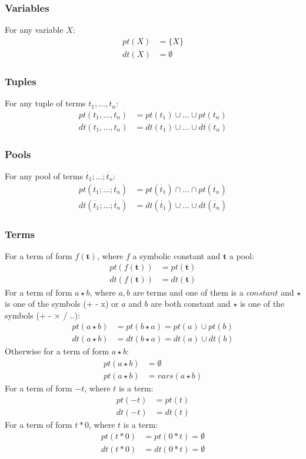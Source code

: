 \documentclass{article}
\newcommand{\pool}[1]{\boldsymbol{#1}}
\newcommand{\tuple}[1]{\dot{#1}}
\newcommand{\set}[1]{\{#1\}}
\begin{document}
	\subsubsection{Variables}
	For any variable $X$:
	\begin{align}
		pt(X) &= \set{X} \\
		dt(X) &= \emptyset
	\end{align}

	\subsubsection{Tuples}
	For any tuple of terms $t_1,...,t_n$:
	\begin{align}
		pt(t_1,...,t_n) &= pt(t_1) \cup \dots \cup pt(t_n) \\
		dt(t_1,...,t_n) &= dt(t_1) \cup \dots \cup dt(t_n)
	\end{align}

	\subsubsection{Pools}
	For any pool of terms $\tuple{t_1};...;\tuple{t_n}$:
	\begin{align}
		pt(\tuple{t_1};...;\tuple{t_n}) &= pt(\tuple{t_1}) \cap \dots \cap pt(\tuple{t_n}) \\
		dt(\tuple{t_1};...;\tuple{t_n}) &= dt(\tuple{t_1}) \cup \dots \cup dt(\tuple{t_n})
	\end{align}

	\subsubsection{Terms}
	For a term of form $f(\pool{t})$, where $f$ a symbolic constant and $\pool{t}$ a pool:
	\begin{align}
		pt(f(\pool{t})) &= pt(\pool{t}) \\
		dt(f(\pool{t})) &= dt(\pool{t})
	\end{align}
	For a term of form $a \star b$, where $a,b$ are terms and one of them is a $\mathit{constant}$ and $\star$ is one of the symbols (+ - x) or $a$ and $b$ are both constant and $\star$ is one of the symbols (+ - × / ..):
	\begin{align}
		pt(a \star b) &= pt(b \star a) = pt(a) \cup pt(b) \\
		dt(a \star b) &= dt(b \star a) = dt(a) \cup dt(b)
	\end{align}
	Otherwise for a term of form $a \star b$:
	\begin{align}
		pt(a \star b) &= \emptyset \\
		pt(a \star b) &= vars(a \star b)
	\end{align}
	For a term of form $-t$, where $t$ is a term:
	\begin{align}
		pt(-t) &= pt(t) \\
		dt(-t) &= dt(t)
	\end{align}
	For a term of form $t*0$, where $t$ is a term:
	\begin{align}
		pt(t*0) &= pt(0*t) = \emptyset \\
		dt(t*0) &= dt(0*t) = \emptyset
	\end{align}
\end{document}
